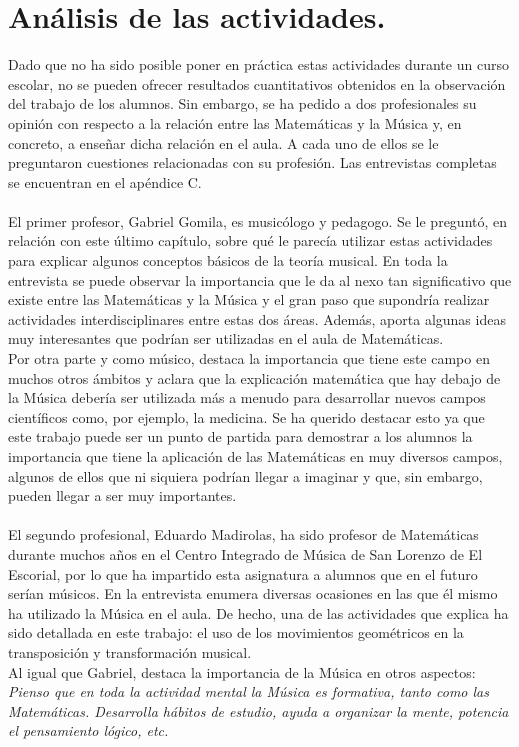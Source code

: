 \documentclass[a4paper, openright, 11pt, titlepage]{report}
\theoremstyle{definition}\newtheorem{defin}[propo]{Definition}
\theoremstyle{definition}\newtheorem{obser}[propo]{Remark}
\theoremstyle{definition}\newtheorem{ejem}[propo]{Ejemplo}
\theoremstyle{definition}\newtheorem{algoritmo}[propo]{Algoritmo}
\begin{document}
\section{Análisis de las actividades.}
Dado que no ha sido posible poner en práctica estas actividades durante un curso escolar, no se pueden ofrecer resultados cuantitativos obtenidos en la observación del trabajo de los alumnos. Sin embargo, se ha pedido a dos profesionales su opinión con respecto a la relación entre las Matemáticas y la Música y, en concreto, a enseñar dicha relación en el aula. A cada uno de ellos se le preguntaron cuestiones relacionadas con su profesión. Las entrevistas completas se encuentran en el apéndice C.\\\\
El primer profesor, Gabriel Gomila, es musicólogo y pedagogo. Se le preguntó, en relación con este último capítulo, sobre qué le parecía utilizar estas actividades para explicar algunos conceptos básicos de la teoría musical. En toda la entrevista se puede observar la importancia que le da al nexo tan significativo que existe entre las Matemáticas y la Música y el gran paso que supondría realizar actividades interdisciplinares entre estas dos áreas. Además, aporta algunas ideas muy interesantes que podrían ser utilizadas en el aula de Matemáticas.\\
Por otra parte y como músico, destaca la importancia que tiene este campo en muchos otros ámbitos y aclara que la explicación matemática que hay debajo de la Música debería ser utilizada más a menudo para desarrollar nuevos campos científicos como, por ejemplo, la medicina. Se ha querido destacar esto ya que este trabajo puede ser un punto de partida para demostrar a los alumnos la importancia que tiene la aplicación de las Matemáticas en muy diversos campos, algunos de ellos que ni siquiera podrían llegar a imaginar y que, sin embargo, pueden llegar a ser muy importantes.\\\\
El segundo profesional, Eduardo Madirolas, ha sido profesor de Matemáticas durante muchos años en el Centro Integrado de Música de San Lorenzo de El Escorial, por lo que ha impartido esta asignatura a alumnos que en el futuro serían músicos. En la entrevista enumera diversas ocasiones en las que él mismo ha utilizado la Música en el aula. De hecho, una de las actividades que explica ha sido detallada en este trabajo: el uso de los movimientos geométricos en la transposición y transformación musical.\\
Al igual que Gabriel, destaca la importancia de la Música en otros aspectos: \textit{Pienso  que  en  toda  la  actividad  mental  la  Música  es  formativa,  tanto  como  las Matemáticas.  Desarrolla  hábitos  de  estudio,  ayuda  a  organizar  la  mente,  potencia  el pensamiento  lógico,  etc.}\\
\end{document}
